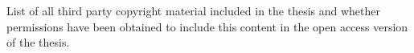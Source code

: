 \documentclass[11pt,a4paper,titlepage,twoside,openright]{style/unimelbthesis}
\begin{document}
\begin{frontmatter}
  \listoftables


  \listoffigures

\begin{copyrightlist}
  List of all third party copyright material included in the thesis and whether
  permissions have been obtained to include this content in the open access
  version of the thesis.
\end{copyrightlist}
\end{frontmatter}
%
\end{document}
